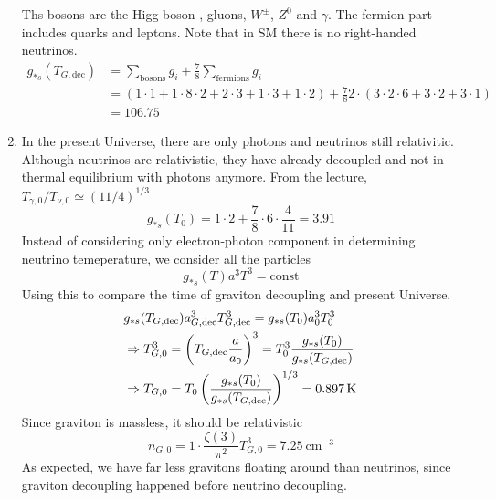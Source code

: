 \begin{enumerate}[label=\alph*)]
      Ths bosons are the Higg boson , gluons, $W^\pm$, $Z^0$ and $\gamma$. The fermion part includes quarks and leptons. Note that in SM there is no right-handed neutrinos.
      \begin{align}
         g_{*s } (T_{G,\text{dec}}) &= \sum_\text{bosons} g_i + \frac{7}{8} \sum_\text{fermions} g_i\\
                 &= (1 \cdot 1 +  1 \cdot 8 \cdot 2 + 2 \cdot 3 + 1 \cdot 3 + 1 \cdot 2) + \frac{7}{8} 2\cdot (3 \cdot 2 \cdot 6 + 3 \cdot 2 + 3 \cdot 1) \\
                 &= 106.75
      \end{align}
   \item In the present Universe, there are only photons and neutrinos still relativitic. Although neutrinos are relativistic, they have already decoupled and not in thermal equilibrium with photons anymore. From the lecture, $T_{\gamma, 0} / T_{\nu, 0} \simeq (11/4)^{1/3} $
      \begin{equation} 
         g_{*s}(T_0) = 1\cdot 2 + \frac{7}{8} \cdot 6 \cdot \frac{4}{11} = 3.91
   \end{equation}
   Instead of considering only electron-photon component in determining neutrino temeperature, we consider all the particles
   \begin{equation*}
      g_{*s}(T) a^3 T^3 = \text{const}
   \end{equation*}
   Using this to compare the time of graviton decoupling and present Universe.
   \begin{align}
     & g_{*s}(T_{G, \text{dec}}) a^3_{G, \text{dec}} T^3_{G, \text{dec}} = g_{*s}( T_0) a_0^3 T^3_0 \notag \\
     &\Rightarrow T_{G,0}^3 = \left( T_{G,\text{dec}} \frac{a}{a_0} \right)^3 = T_0^3 \frac{g_{*s}(T_0)}{g_{*s}(T_{G, \text{dec}})} \notag \\
     &\Rightarrow T_{G,0} = T_0 \left( \frac{g_{*s}(T_0)}{g_{*s}(T_{G, \text{dec}})} \right)^{1/3} = \SI{0.897}{\kelvin}
   \end{align}
   Since graviton is massless, it should be relativistic
   \begin{equation}
      n_{G,0} = 1\cdot \frac{\zeta(3)}{\pi^2} T_{G,0}^3 = \SI{7.25}{\cm\tothe{-3}}
   \end{equation}
   As expected, we have far less gravitons floating around than neutrinos, since graviton decoupling happened before neutrino decoupling.
\end{enumerate}
